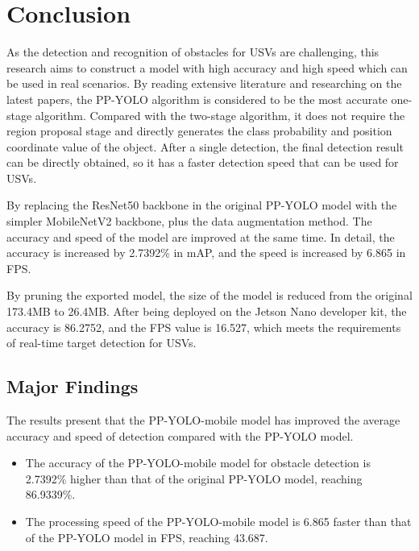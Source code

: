 \documentclass[sensors,article,submit,moreauthors,pdftex]{Definitions/mdpi}
\begin{document}
\section{Conclusion}


As the detection and recognition of obstacles for USVs are challenging, this research aims to construct a model with high accuracy and high speed which can be used in real scenarios. By reading extensive literature and researching on the latest papers, the PP-YOLO algorithm is considered to be the most accurate one-stage algorithm. Compared with the two-stage algorithm, it does not require the region proposal stage and directly generates the class probability and position coordinate value of the object. After a single detection, the final detection result can be directly obtained, so it has a faster detection speed that can be used for USVs.

By replacing the ResNet50 backbone in the original PP-YOLO model with the simpler MobileNetV2 backbone, plus the data augmentation method. The accuracy and speed of the model are improved at the same time. In detail, the accuracy is increased by 2.7392\% in mAP, and the speed is increased by 6.865 in FPS.

By pruning the exported model, the size of the model is reduced from the original 173.4MB to 26.4MB. After being deployed on the Jetson Nano developer kit, the accuracy is 86.2752, and the FPS value is 16.527, which meets the requirements of real-time target detection for USVs.

\subsection{Major Findings}
The results present that the PP-YOLO-mobile model has improved the average accuracy and speed of detection compared with the PP-YOLO model.

\begin{itemize}
\item{The accuracy of the PP-YOLO-mobile model for obstacle detection is 2.7392\% higher than that of the original PP-YOLO model, reaching 86.9339\%.}
\end{itemize}

\begin{itemize}
\item{The processing speed of the PP-YOLO-mobile model is 6.865 faster than that of the PP-YOLO model in FPS, reaching 43.687.}

\end{itemize}
\end{document}
